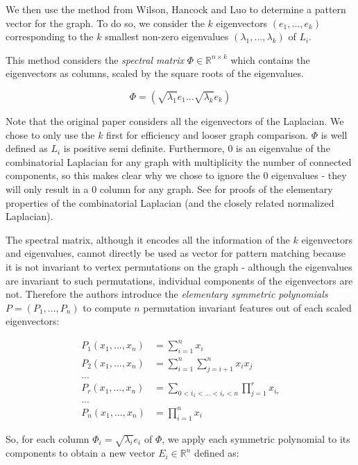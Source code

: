 We then use the method from Wilson, Hancock and Luo \cite{wilson2005pattern} to determine a pattern vector for the graph. To do so, we consider the $k$ eigenvectors $(e_1, ..., e_k)$ corresponding to the $k$ smallest non-zero eigenvalues $(\lambda_1, ..., \lambda_k)$ of $L_i$. 

This method considers the \emph{spectral matrix} $\Phi \in \mathbb{R}^{n \times k}$ which contains the eigenvectors as columns, scaled by the square roots of the eigenvalues.

\[
\Phi = (\sqrt{\lambda_1}e_1 ... \sqrt{\lambda_k}e_k)
\]

Note that the original paper considers all the eigenvectors of the Laplacian. We chose to only use the $k$ first for efficiency and looser graph comparison.
$\Phi$ is well defined as $L_i$ is positive semi definite. Furthermore, $0$ is an eigenvalue of the combinatorial Laplacian for any graph with multiplicity the number of connected components, so this makes clear why we chose to ignore the $0$ eigenvalues - they will only result in a $0$ column for any graph. See \cite{chung1997spectral} for proofs of the elementary properties of the combinatorial Laplacian (and the closely related normalized Laplacian).


The spectral matrix, although it encodes all the information of the $k$ eigenvectors and eigenvalues, cannot directly be used as vector for pattern matching because it is not invariant to vertex permutations on the graph - although the eigenvalues are invariant to such permutations, individual components of the eigenvectors are not. Therefore the authors introduce the \emph{elementary symmetric polynomials} $P = (P_1, ..., P_n)$ to compute $n$ permutation invariant features out of each scaled eigenvectors:

\begin{align*}
P_1(x_1, ..., x_n) &= \sum_{i = 1}^n x_i\\
P_2(x_1, ..., x_n) &= \sum_{i = 1}^n \sum_{j = i + 1}^n x_ix_j\\
... & \\
P_r(x_1, ..., x_n) &= \sum_{0 < i_1 < ... < i_r < n} \prod_{j = 1}^r x_{i_r}\\
... & \\
P_n(x_1, ..., x_n) &= \prod_{i = 1}^n x_i
\end{align*}

So, for each column $\Phi_i = \sqrt{\lambda_i}e_i$ of $\Phi$, we apply each symmetric polynomial to its components to obtain a new vector $E_i \in \mathbb{R}^n$ defined as:

